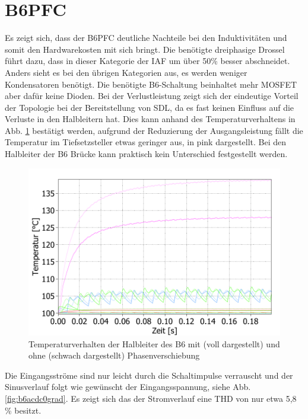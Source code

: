 \section{B6PFC}
	Es zeigt sich, dass der \gls{B6PFC} deutliche Nachteile bei den Induktivitäten und somit den Hardwarekosten mit sich bringt. Die benötigte dreiphasige Drossel führt dazu, dass in dieser Kategorie der IAF um über 50\% besser abschneidet.
	Anders sieht es bei den übrigen Kategorien aus, es werden weniger Kondensatoren benötigt. Die benötigte B6-Schaltung beinhaltet mehr \gls{MOSFET} aber dafür keine Dioden. Bei der Verlustleistung zeigt sich der eindeutige Vorteil der Topologie bei der Bereitstellung von \gls{SDL}, da es fast keinen Einfluss auf die Verluste in den Halbleitern hat. Dies kann anhand des Temperaturverhaltens in Abb. \ref{fig:b6temp030grad} bestätigt werden, aufgrund der Reduzierung der Ausgangsleistung fällt die Temperatur im Tiefsetzsteller etwas geringer aus, in pink dargestellt. Bei den Halbleiter der B6 Brücke kann praktisch kein Unterschied festgestellt werden.
	\begin{figure}
		\centering
		\includegraphics[width=0.9\linewidth]{content/Grafiken/B6_Temp_0&30Grad}
		\caption{Temperaturverhalten der Halbleiter des B6 mit (voll dargestellt) und ohne (schwach dargestellt) Phasenverschiebung}
		\label{fig:b6temp030grad}
	\end{figure}
	Die Eingangsströme sind nur leicht durch die Schaltimpulse verrauscht und der Sinusverlauf folgt wie gewünscht der Eingangsspannung, siehe Abb. \ref{fig:b6acdc0grad}. Es zeigt sich das der Stromverlauf eine \gls{THD} von nur etwa 5,8 \% besitzt. 
	
